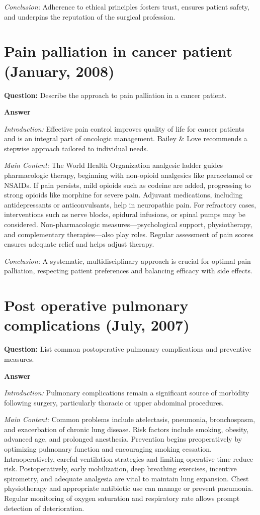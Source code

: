 \documentclass{article}
\begin{document}
\emph{Conclusion:} Adherence to ethical principles fosters trust, ensures patient safety, and underpins the reputation of the surgical profession.


\section{Pain palliation in cancer patient (January, 2008)}


\textbf{Question:} Describe the approach to pain palliation in a cancer patient.

\textbf{Answer}

\emph{Introduction:} Effective pain control improves quality of life for cancer patients and is an integral part of oncologic management. Bailey \& Love recommends a stepwise approach tailored to individual needs.

\emph{Main Content:} The World Health Organization analgesic ladder guides pharmacologic therapy, beginning with non-opioid analgesics like paracetamol or NSAIDs. If pain persists, mild opioids such as codeine are added, progressing to strong opioids like morphine for severe pain. Adjuvant medications, including antidepressants or anticonvulsants, help in neuropathic pain. For refractory cases, interventions such as nerve blocks, epidural infusions, or spinal pumps may be considered. Non-pharmacologic measures—psychological support, physiotherapy, and complementary therapies—also play roles. Regular assessment of pain scores ensures adequate relief and helps adjust therapy.

\emph{Conclusion:} A systematic, multidisciplinary approach is crucial for optimal pain palliation, respecting patient preferences and balancing efficacy with side effects.


\section{Post operative pulmonary complications (July, 2007)}


\textbf{Question:} List common postoperative pulmonary complications and preventive measures.

\textbf{Answer}

\emph{Introduction:} Pulmonary complications remain a significant source of morbidity following surgery, particularly thoracic or upper abdominal procedures.

\emph{Main Content:} Common problems include atelectasis, pneumonia, bronchospasm, and exacerbation of chronic lung disease. Risk factors include smoking, obesity, advanced age, and prolonged anesthesia. Prevention begins preoperatively by optimizing pulmonary function and encouraging smoking cessation. Intraoperatively, careful ventilation strategies and limiting operative time reduce risk. Postoperatively, early mobilization, deep breathing exercises, incentive spirometry, and adequate analgesia are vital to maintain lung expansion. Chest physiotherapy and appropriate antibiotic use can manage or prevent pneumonia. Regular monitoring of oxygen saturation and respiratory rate allows prompt detection of deterioration.
\end{document}
